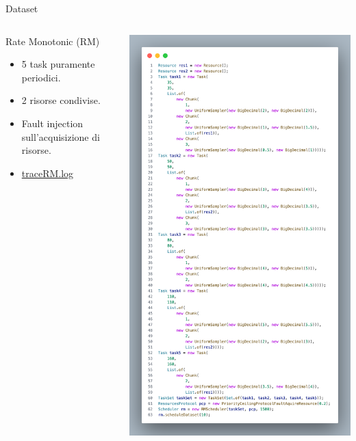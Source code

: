 \begin{frame}{Dataset}
    \begin{columns}
        \begin{column}{.6\textwidth}
            \begin{block}{Rate Monotonic (RM)}
                \begin{itemize}
                    \item 5 task puramente periodici.
                    \item 2 risorse condivise.
                    \item Fault injection sull'acquisizione di risorse.
                    \item \href{https://github.com/edoardosarri24/real-time-scheduling-simulator/blob/master/output/traceRM.log}{traceRM.log}
                \end{itemize}
            \end{block}
        \end{column}
        \begin{column}{.4\textwidth}
            \centering
            \includegraphics[width=.7\textwidth]{images/4-dataset/datasetRM.pdf}
        \end{column}
    \end{columns}
\end{frame}